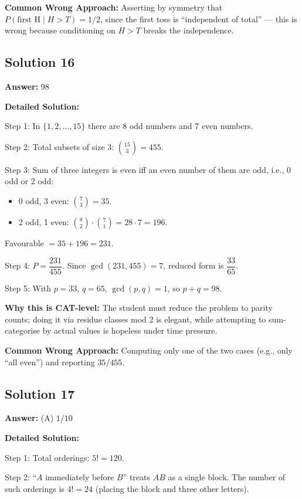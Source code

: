 \documentclass[11pt,a4paper]{article}
\begin{document}
\textbf{Common Wrong Approach:} Asserting by symmetry that \(P(\text{first H} \mid H > T) = 1/2\), since the first toss is ``independent of total'' --- this is wrong because conditioning on \(H > T\) breaks the independence.

\subsection*{Solution 16}
\textbf{Answer:} 98

\textbf{Detailed Solution:}

Step 1: In \(\{1, 2, \ldots, 15\}\) there are 8 odd numbers and 7 even numbers.

Step 2: Total subsets of size 3: \(\binom{15}{3} = 455\).

Step 3: Sum of three integers is even iff an even number of them are odd, i.e., 0 odd or 2 odd:
\begin{itemize}[leftmargin=*,topsep=0pt,itemsep=0pt]
    \item 0 odd, 3 even: \(\binom{7}{3} = 35\).
    \item 2 odd, 1 even: \(\binom{8}{2} \cdot \binom{7}{1} = 28 \cdot 7 = 196\).
\end{itemize}
Favourable \(= 35 + 196 = 231\).

Step 4: \(P = \dfrac{231}{455}\). Since \(\gcd(231, 455) = 7\), reduced form is \(\dfrac{33}{65}\).

Step 5: With \(p = 33\), \(q = 65\), \(\gcd(p,q) = 1\), so \(p + q = 98\).

\textbf{Why this is CAT-level:} The student must reduce the problem to parity counts; doing it via residue classes mod 2 is elegant, while attempting to sum-categorise by actual values is hopeless under time pressure.

\textbf{Common Wrong Approach:} Computing only one of the two cases (e.g., only ``all even'') and reporting \(35/455\).

\subsection*{Solution 17}
\textbf{Answer:} (A) \(1/10\)

\textbf{Detailed Solution:}

Step 1: Total orderings: \(5! = 120\).

Step 2: ``\(A\) immediately before \(B\)'' treats \(AB\) as a single block. The number of such orderings is \(4! = 24\) (placing the block and three other letters).
\end{document}
